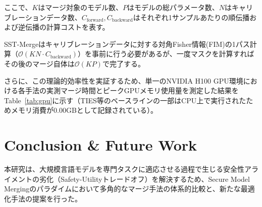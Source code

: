 \documentclass{article}
\begin{document}
ここで、$K$はマージ対象のモデル数、$P$はモデルの総パラメータ数、$N$はキャリブレーションデータ数、$C_{\text{forward}},C_{\text{backward}}$はそれぞれ1サンプルあたりの順伝播および逆伝播の計算コストを表す。

SST-Mergeはキャリブレーションデータに対する対角Fisher情報(FIM)の1パス計算（$\mathcal{O}(KN \cdot C_{\text{backward}})$）を事前に行う必要があるが、一度マスクを計算すればその後のマージ自体は$\mathcal{O}(KP)$で完了する。

さらに、この理論的効率性を実証するため、単一のNVIDIA H100 GPU環境における各手法の実測マージ時間とピークGPUメモリ使用量を測定した結果をTable~\ref{tab:gpu}に示す（TIES等のベースラインの一部はCPU上で実行されたためメモリ消費が0.00GBとして記録されている）。

\begin{table}[H]
\centering
\caption{各マージ手法の実測マージ時間とピークGPUメモリ(平均)}
\label{tab:gpu}
\small
{}
\end{table}

\section{Conclusion \& Future Work}

本研究は、大規模言語モデルを専門タスクに適応させる過程で生じる安全性アライメントの劣化（Safety-Utilityトレードオフ）を解決するため、Secure Model Mergingのパラダイムにおいて多角的なマージ手法の体系的比較と、新たな最適化手法の提案を行った。
\end{document}
